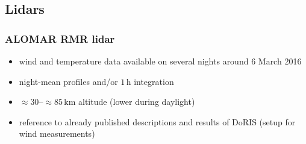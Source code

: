 \subsection{Lidars}

\subsubsection{ALOMAR RMR lidar}
\begin{itemize}
  \item wind and temperature data available on several nights around 6 March 2016
  \item night-mean profiles and/or $1$\,h integration
  \item $\approx 30$--$\approx85$\,km altitude (lower during daylight)
  \medskip
  \item reference to already published descriptions and results of DoRIS (setup for wind measurements)
\end{itemize}

